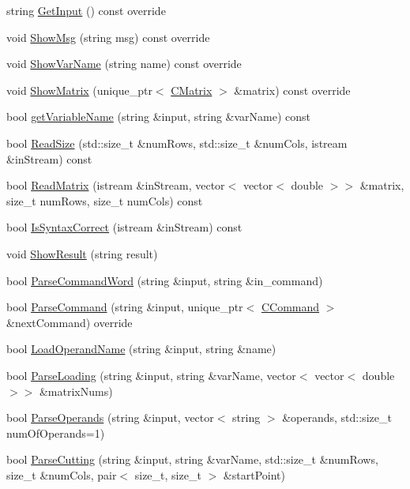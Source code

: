 \begin{DoxyCompactItemize}
\item 
string \hyperlink{classCApplicationConsole_a0af959fae7259bf81f7855985e16adff}{Get\+Input} () const override
\item 
void \hyperlink{classCApplicationConsole_a32152dd2a1793b20fd03ba3179d8e22e}{Show\+Msg} (string msg) const override
\item 
void \hyperlink{classCApplicationConsole_a20c9dbcb6b56834b28ff9909f446848f}{Show\+Var\+Name} (string name) const override
\item 
void \hyperlink{classCApplicationConsole_a7c024277c01acd4cc575ad64ffd07a22}{Show\+Matrix} (unique\+\_\+ptr$<$ \hyperlink{classCMatrix}{C\+Matrix} $>$ \&matrix) const override
\item 
bool \hyperlink{classCApplicationConsole_a95f0c288b2224cc1273cf20472cbc34f}{get\+Variable\+Name} (string \&input, string \&var\+Name) const 
\item 
bool \hyperlink{classCApplicationConsole_a1444353413fae5d03ba68a803f724379}{Read\+Size} (std\+::size\+\_\+t \&num\+Rows, std\+::size\+\_\+t \&num\+Cols, istream \&in\+Stream) const 
\item 
bool \hyperlink{classCApplicationConsole_a2323e596b3a019fe843f88955218baba}{Read\+Matrix} (istream \&in\+Stream, vector$<$ vector$<$ double $>$$>$ \&matrix, size\+\_\+t num\+Rows, size\+\_\+t num\+Cols) const 
\item 
bool \hyperlink{classCApplicationConsole_a6ca78c0250dfbdf71a995277c0485e5a}{Is\+Syntax\+Correct} (istream \&in\+Stream) const 
\item 
void \hyperlink{classCApplicationConsole_a311cfc33ddf26daa5f6a759a335ea007}{Show\+Result} (string result)
\item 
bool \hyperlink{classCApplicationConsole_a4ae836d72b1ecdc4b3c3e15ff5f171b6}{Parse\+Command\+Word} (string \&input, string \&in\+\_\+command)
\item 
bool \hyperlink{classCApplicationConsole_ae2ee7085fd41f96607d37673ed705e76}{Parse\+Command} (string \&input, unique\+\_\+ptr$<$ \hyperlink{classCCommand}{C\+Command} $>$ \&next\+Command) override
\item 
bool \hyperlink{classCApplicationConsole_a12531e44827274807a3a0787e66345fe}{Load\+Operand\+Name} (string \&input, string \&name)
\item 
bool \hyperlink{classCApplicationConsole_a092af2533775a460a05e7c5198d991fa}{Parse\+Loading} (string \&input, string \&var\+Name, vector$<$ vector$<$ double $>$$>$ \&matrix\+Nums)
\item 
bool \hyperlink{classCApplicationConsole_a00a40d89b87f545373a7ce3d22a7c996}{Parse\+Operands} (string \&input, vector$<$ string $>$ \&operands, std\+::size\+\_\+t num\+Of\+Operands=1)
\item 
bool \hyperlink{classCApplicationConsole_ae3c29fe61ba160f51ead41382df8c494}{Parse\+Cutting} (string \&input, string \&var\+Name, std\+::size\+\_\+t \&num\+Rows, size\+\_\+t \&num\+Cols, pair$<$ size\+\_\+t, size\+\_\+t $>$ \&start\+Point)
\end{DoxyCompactItemize}
